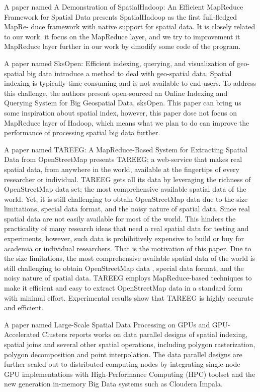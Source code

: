 A paper named A Demonstration of SpatialHadoop: An Efficient MapReduce Framework for Spatial Data \cite{eldawy2013demonstration}  presents SpatialHadoop as the first full-fledged MapRe- duce framework with native support for spatial data. It is closely related to our work. it focus on the MapReduce layer, and we try to improvement it MapReduce layer further in our work by dmodify some code of the program.  


A paper named SksOpen: Efficient indexing, querying, and visualization of geo-spatial big data \cite{lu2013sksopen} introduce a method to deal with geo-spatial data. Spatial indexing is typically time-consuming and is not available to end-users. To address this challenge,  the authors present open-sourced an Online Indexing and Querying System for Big Geospatial Data, sksOpen. This paper can bring us some inspiration about spatial index, however, this paper dose not focus on MapReduce layer of Hadoop, which means what we plan to do can improve the performance of processing spatial big data further.


A paper named TAREEG: A MapReduce-Based System for Extracting Spatial Data from OpenStreetMap \cite{alarabi2014tareeg} presents TAREEG; a web-service that makes real spatial data, from anywhere in the world, available at the fingertips of every researcher or individual. TAREEG gets all its data by leveraging the richness of OpenStreetMap data set; the most comprehensive available spatial data of the world. Yet, it is still challenging to obtain OpenStreetMap data due to the size limitations, special data format, and the noisy nature of spatial data. Since real spatial data are not easily available for most of the world. This hinders the practicality of many research ideas that need a real spatial data for testing and experiments, however, such data is prohibitively expensive to build or buy for academia or individual researchers. That is the motivation of this paper. Due to the size limitations, the most comprehensive available spatial data of the world is still challenging to obtain OpenStreetMap data , special data format, and the noisy nature of spatial data. TAREEG employs MapReduce-based techniques to make it efficient and easy to extract OpenStreetMap data in a standard form with minimal effort. Experimental results show that TAREEG is highly accurate and efficient. 


A paper named Large-Scale Spatial Data Processing on GPUs and GPU-Accelerated Clusters \cite{zhang2015large} reports works on data parallel designs of spatial indexing, spatial joins and several other spatial operations, including polygon rasterization, polygon decomposition and point interpolation. The data parallel designs are further scaled out to distributed computing nodes by integrating single-node GPU implementations with High-Performance Computing (HPC) toolset and the new generation in-memory Big Data systems such as Cloudera Impala.



